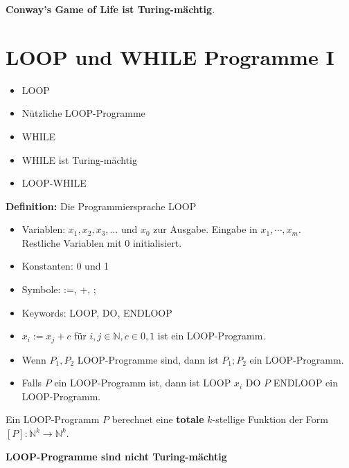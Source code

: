\documentclass[a4paper,graphics,11pt]{article}
\begin{document}
\textbf{Conway's Game of Life ist Turing-mächtig}.



\newpage



\section{LOOP und WHILE Programme I}
\begin{itemize}
    \item LOOP
    \item Nützliche LOOP-Programme
    \item WHILE
    \item WHILE ist Turing-mächtig
    \item LOOP-WHILE
\end{itemize}

\textbf{Definition:} Die Programmiersprache LOOP
\begin{itemize}
    \item Variablen: $x_1,x_2,x_3,\dots$ und $x_0$ zur Ausgabe.
        Eingabe in $x_1,\cdots,x_m$.\\
        Restliche Variablen mit 0 initialisiert.
    \item Konstanten: 0 und 1
    \item Symbole: :=, +, ;
    \item Keywords: LOOP, DO, ENDLOOP
    \\
    \item $x_i := x_j + c$ für $i,j \in \mathbb{N}, c\in {0,1}$ ist ein LOOP-Programm.
    \item Wenn $P_1,P_2$ LOOP-Programme sind, dann ist $P_1;P_2$ ein LOOP-Programm.
    \item Falls $P$ ein LOOP-Programm ist, dann ist LOOP $x_i$ DO $P$ ENDLOOP ein LOOP-Programm.
\end{itemize}
Ein LOOP-Programm $P$ berechnet eine \textbf{totale} $k$-stellige Funktion der Form
$[P] : \mathbb{N}^k \to \mathbb{N}^k$.

\textbf{LOOP-Programme sind nicht Turing-mächtig}

\strut
\end{document}
